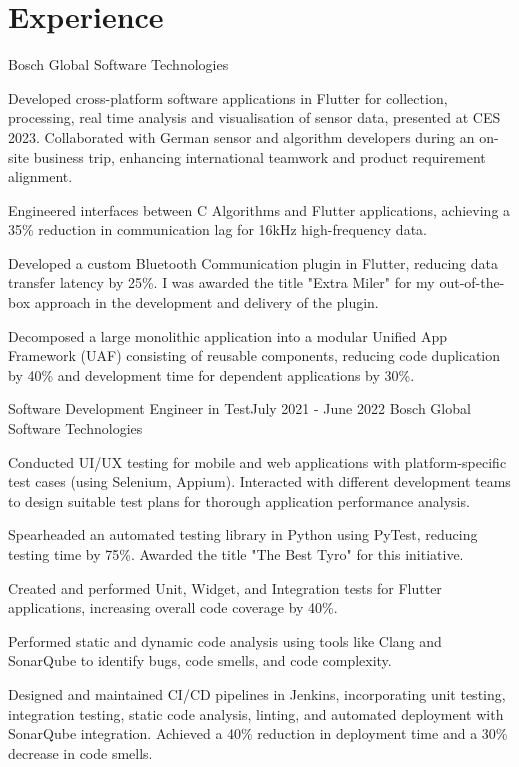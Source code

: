 \vspace{-5pt}
\section{Experience}
\resumeSubHeadingListStart
    {Bosch Global Software Technologies}{}
    \resumeItemListStart
          {
\item Developed cross-platform software applications in Flutter for collection, processing, real time analysis and visualisation of sensor data, presented at CES 2023. Collaborated with German sensor and algorithm developers during an on-site business trip, enhancing international teamwork and product requirement alignment.
  \item Engineered interfaces between C Algorithms and Flutter applications, achieving a 35\% reduction in communication lag for 16kHz high-frequency data.
  \item Developed a custom Bluetooth Communication plugin in Flutter, reducing data transfer latency by 25\%. I was awarded the title "Extra Miler" for my out-of-the-box approach in the development and delivery of the plugin.
  \item  Decomposed a large monolithic application into a modular Unified App Framework (UAF) consisting of reusable components, reducing code duplication by 40\% and development time for dependent applications by 30\%. 


}      \resumeItemListEnd
\vspace{-1pt}

\resumeSubheading
  {Software Development Engineer in Test}{July 2021 - June 2022}
  {Bosch Global Software Technologies}{}
  \resumeItemListStart
    \item Conducted UI/UX testing for mobile and web applications with platform-specific test cases (using Selenium, Appium). Interacted with different development teams to design suitable test plans for thorough application performance analysis.
    \item Spearheaded an automated testing library in Python using PyTest, reducing testing time by 75\%. Awarded the title "The Best Tyro" for this initiative.
    \item Created and performed Unit, Widget, and Integration tests for Flutter applications, increasing overall code coverage by 40\%.
    \item Performed static and dynamic code analysis using tools like Clang and SonarQube to identify bugs, code smells, and code complexity.
    \item Designed and maintained CI/CD pipelines in Jenkins, incorporating unit testing, integration testing, static code analysis, linting, and automated deployment with SonarQube integration. Achieved a 40\% reduction in deployment time and a 30\% decrease in code smells.
  \resumeItemListEnd
\vspace{-1pt}

